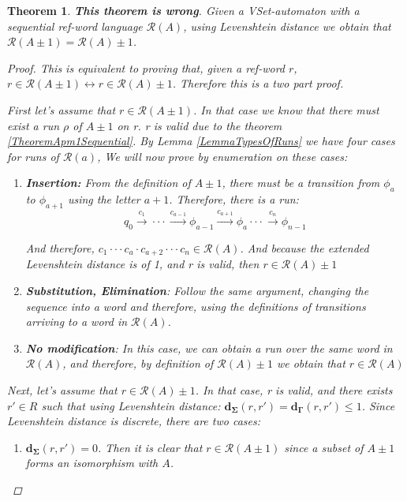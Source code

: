 \documentclass{article}
\newcommand{\trans}[1]{\overset{#1}{\longrightarrow}}
\newtheorem{theorem}{Theorem}
\begin{document}
\begin{theorem} \label{TheoremAutomatonPM1}
    \textbf{This theorem is wrong}.
    Given a VSet-automaton with a sequential ref-word language
    $\mathcal{R}(A)$, using Levenshtein distance we obtain that
    $\mathcal{R}(A \pm 1) = \mathcal{R}(A) \pm 1$.

    \begin{proof}
	This is equivalent to proving that, given a ref-word $r$,
	$r \in \mathcal{R}(A \pm 1) \leftrightarrow r \in
	\mathcal{R}(A)\pm 1$. Therefore this is a two part proof.

	First let's assume that $r \in \mathcal{R}(A \pm 1)$. In
	that case we know that there must exist a run $\rho$ of $A
    \pm 1$ on r. r is valid due to the theorem \ref{TheoremApm1Sequential}.
        By Lemma \ref{LemmaTypesOfRuns} we have four cases for runs of $\mathcal{R}(a)$, We will now prove by enumeration on these cases:
    \begin{enumerate}
        \item \textbf{Insertion:} From the definition of $A \pm 1$, there must be a transition from $\phi_a$ to $\phi_{a+1}$ using the letter $a + 1$. Therefore, there is a run:
        \begin{equation*}
            q_0 \trans{c_1} \cdot\cdot\cdot\trans{c_{a-1}}\phi_{a-1} \trans{c_{a+1}} \phi_{a} \cdot\cdot\cdot \trans{c_n} \phi_{n - 1}
        \end{equation*}

	    And therefore, $c_1 \cdot\cdot\cdot c_a \cdot c_{a+2}
	    \cdot\cdot\cdot c_n \in \mathcal{R}(A)$. And because
	    the extended Levenshtein distance is of 1, and r is
	    valid, then $r \in \mathcal{R}(A) \pm 1$
            
    \item \textbf{Substitution, Elimination}: Follow the same argument, changing the sequence into a word and therefore, using the definitions of transitions arriving to a word in $\mathcal{R}(A)$.
        \item \textbf{No modification}: In this case, we can obtain a run over the same word
            in $\mathcal{R}(A)$, and therefore, by definition of $\mathcal{R}(A)
            \pm 1$ we obtain that $r \in \mathcal{R}(A)$
	    \end{enumerate}



        Next, let's assume that $r \in \mathcal{R}(A) \pm 1$. In that case, r is valid, and there exists $r' \in R$ such that using Levenshtein distance: $\mathbf{d_\Sigma}(r, r') = \mathbf{d_\Gamma}(r, r') \leq 1$. Since Levenshtein distance is discrete, there are two cases:
        \begin{enumerate}
            \item $\mathbf{d_\Sigma}(r, r') = 0$. Then it is clear
            that $r \in \mathcal{R}(A \pm 1)$ since a subset of $A
            \pm 1$ forms an isomorphism with $A$.


\end{enumerate}
\end{proof}
\end{theorem}
\end{document}
